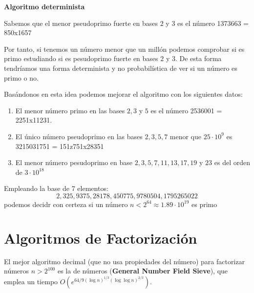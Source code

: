 \begin{example}\textbf{Algoritmo determinista}

Sabemos que el menor pseudoprimo fuerte en bases $2$ y $3$ es el número 1373663 = 850x1657

Por tanto, si tenemos un número menor que un millón podemos comprobar si es primo estudiando si es pesudoprimo fuerte en bases $2$ y $3$. De esta forma tendríamos una forma determinista y no probabilística de ver si un número es primo o no. 

Basándonos en esta idea podemos mejorar el algoritmo con los siguientes datos:
\begin{enumerate}
\item El menor número primo en las bases $2,3$ y $5$ es el número 2536001 = 2251x11231.

\item El único número pseudoprimo en las bases $2,3,5,7$ menor que $25 \cdot 10^9$ es 3215031751 = 151z751x28351

\item El menor número pesudoprimo en base $2,3,5,7,11,13,17,19$ y $23$ es del orden de $3 \cdot 10^{18}$

\end{enumerate}
\end{example}

\begin{theorem}
Empleando la base de 7 elementos:
\[2,325,9375,28178,450775,9780504,1795265022\]
podemos decidr con certeza si un número $n<2^{64}\approx 1.89\cdot 10^{19}$ es primo
\end{theorem}

\section{Algoritmos de Factorización}
El mejor algoritmo decimal (que no usa propiedades del número) para factorizar números $n>2^{100}$ es la  de números (\textbf{General Number Field Sieve}), que emplea un tiempo $O\left(e^{64/9 (\log n)^{1/3}(\log\log n)^{2/3}} \right)$.

